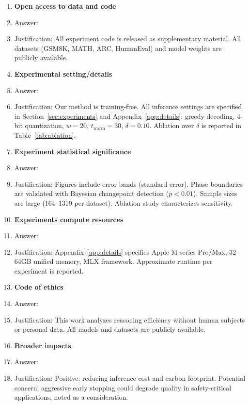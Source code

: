\begin{enumerate}
\item {\bf Open access to data and code}
    \item[] Answer: \answerYes{}
    \item[] Justification: All experiment code is released as supplementary material. All datasets (GSM8K, MATH, ARC, HumanEval) and model weights are publicly available.

\item {\bf Experimental setting/details}
    \item[] Answer: \answerYes{}
    \item[] Justification: Our method is training-free. All inference settings are specified in Section~\ref{sec:experiments} and Appendix~\ref{app:details}: greedy decoding, 4-bit quantization, $w{=}20$, $t_{\text{warm}}{=}30$, $\delta{=}0.10$. Ablation over $\delta$ is reported in Table~\ref{tab:ablation}.

\item {\bf Experiment statistical significance}
    \item[] Answer: \answerYes{}
    \item[] Justification: Figures include error bands (standard error). Phase boundaries are validated with Bayesian changepoint detection ($p < 0.01$). Sample sizes are large (164--1319 per dataset). Ablation study characterizes sensitivity.

\item {\bf Experiments compute resources}
    \item[] Answer: \answerYes{}
    \item[] Justification: Appendix~\ref{app:details} specifies Apple M-series Pro/Max, 32--64GB unified memory, MLX framework. Approximate runtime per experiment is reported.

\item {\bf Code of ethics}
    \item[] Answer: \answerYes{}
    \item[] Justification: This work analyzes reasoning efficiency without human subjects or personal data. All models and datasets are publicly available.

\item {\bf Broader impacts}
    \item[] Answer: \answerYes{}
    \item[] Justification: Positive: reducing inference cost and carbon footprint. Potential concern: aggressive early stopping could degrade quality in safety-critical applications, noted as a consideration.


\end{enumerate}
